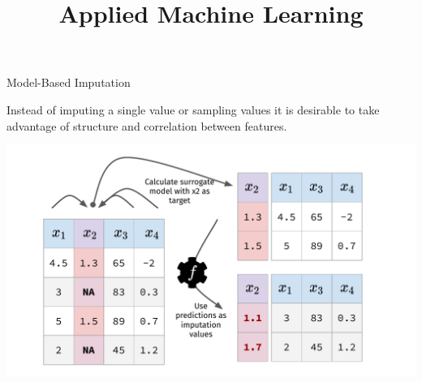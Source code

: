 \documentclass[11pt,compress,t,notes=noshow, xcolor=table]{beamer}
\title{Applied Machine Learning}
\date{}
\begin{document}


\begin{frame}{Model-Based Imputation}

    Instead of imputing a single value or sampling values it is desirable to take advantage of structure and correlation between features.
    
    \begin{center}
        \includegraphics[width=\textwidth]{figure_man/fe_imputation_models_first_slide}
    \end{center}

\end{frame}
\end{document}
